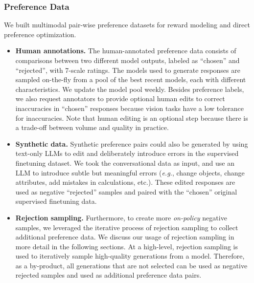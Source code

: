 \subsubsection{Preference Data}
\label{subsubsection:vision_preference_data}
We built multimodal pair-wise preference datasets for reward modeling and direct preference optimization.
\begin{itemize}

\item \textbf{Human annotations.} The human-annotated preference data consists of comparisons between two different model outputs, labeled as ``chosen'' and ``rejected'', with 7-scale ratings. The models used to generate responses are sampled on-the-fly from a pool of the best recent models, each with different characteristics. We update the model pool weekly. Besides preference labels, we also request annotators to provide optional human edits to correct inaccuracies in ``chosen'' responses because vision tasks have a low tolerance for inaccuracies. Note that human editing is an optional step because there is a trade-off between volume and quality in practice.

\item \textbf{Synthetic data.} Synthetic preference pairs could also be generated by using text-only LLMs to edit and deliberately introduce errors in the supervised finetuning dataset. We took the conversational data as input, and use an LLM to introduce subtle but meaningful errors (\textit{e.g.}, change objects, change attributes, add mistakes in calculations, etc.). These edited responses are used as negative ``rejected'' samples and paired with the ``chosen'' original supervised finetuning data.

\item \textbf{Rejection sampling.} Furthermore, to create more \emph{on-policy} negative samples, we leveraged the iterative process of rejection sampling to collect additional preference data. We discuss our usage of rejection sampling in more detail in the following sections. At a high-level, rejection sampling is used to iteratively sample high-quality generations from a model. Therefore, as a by-product, all generations that are not selected can be used as negative rejected samples and used as additional preference data pairs.

\end{itemize}

